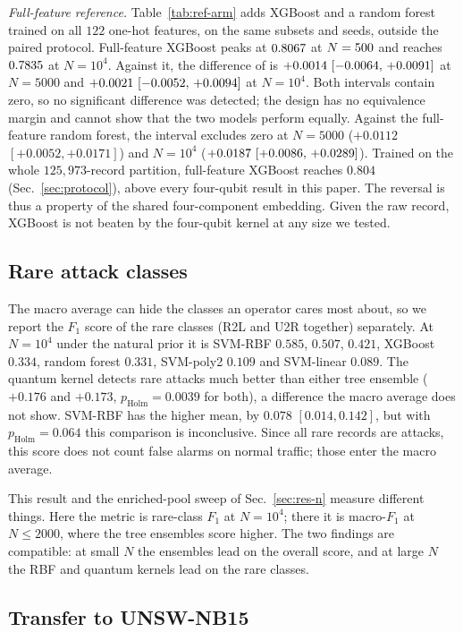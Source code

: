 \emph{Full-feature reference.} Table~\ref{tab:ref-arm} adds XGBoost and a random forest trained
on all $122$ one-hot features, on the same subsets and seeds, outside the paired protocol.
Full-feature XGBoost peaks at $0.8067$ at $N=500$ and reaches
$0.7835$ at $N=10^4$. Against it, the difference of \QSVM{} is $\refArmDeltaXgbFiveK$ at
$N=5000$ and $\refArmDeltaXgbTenK$ at $N=10^4$. Both intervals contain zero, so no significant
difference was detected; the design has no equivalence margin and cannot show that the two
models perform equally. Against the full-feature random forest, the interval excludes zero at
$N=5000$ ($+0.0112$ $[+0.0052,+0.0171]$) and $N=10^4$ ($\refArmDeltaRfTenK$). Trained on the whole $125{,}973$-record partition, full-feature XGBoost
reaches $0.804$ (Sec.~\ref{sec:protocol}), above every four-qubit result in this paper. The
reversal is thus a property of the shared four-component embedding. Given the raw record,
XGBoost is not beaten by the four-qubit kernel at any size we tested.

\subsection{Rare attack classes}\label{sec:res-rare}

The macro average can hide the classes an operator cares most about, so we report the $F_1$
score of the rare classes (R2L and U2R together) separately. At $N=10^4$ under the natural
prior it is SVM-RBF $0.585$, \QSVM{} $0.507$, \QSVMZ{} $0.421$, XGBoost $0.334$, random
forest $0.331$, SVM-poly2 $0.109$ and SVM-linear $0.089$. The quantum kernel detects rare attacks
much better than either tree ensemble ($+0.176$ and $+0.173$, $p_{\mathrm{Holm}}=0.0039$ for
both), a difference the macro average does not show. SVM-RBF has the higher mean, by $0.078$
$[0.014,0.142]$, but with $p_{\mathrm{Holm}}=0.064$ this comparison is inconclusive. Since all
rare records are attacks, this score does not count false alarms on normal traffic; those
enter the macro average.

This result and the enriched-pool sweep of Sec.~\ref{sec:res-n} measure different things. Here
the metric is rare-class $F_1$ at $N=10^4$; there it is macro-$F_1$ at $N\leq2000$, where the
tree ensembles score higher. The two findings are compatible: at small $N$ the ensembles lead on
the overall score, and at large $N$ the RBF and quantum kernels lead on the rare classes.

\subsection{Transfer to UNSW-NB15}\label{sec:res-unsw}

